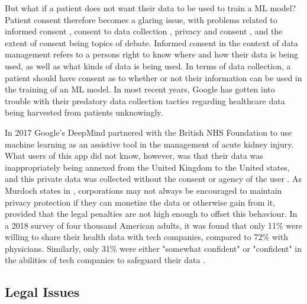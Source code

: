 \documentclass[12pt]{article}
\begin{document}
But what if a patient does not want their data to be used to train a ML model? Patient consent therefore becomes a glaring issue, with problems related to informed consent \citep{Gerke_2020,Guan_2019}, consent to data collection \citep{Gerke_2020,Ali_2023,Murdoch_2021}, privacy and consent \citep{Murdoch_2021}, and the extent of consent \citep{Racine_2019,Price_2019} being topics of debate. Informed consent in the context of data management refers to a persons right to know where and how their data is being used, as well as what kinds of data is being used. In terms of data collection, a patient should have consent as to whether or not their information can be used in the training of an ML model. In most recent years, Google has gotten into trouble with their predatory data collection tactics regarding healthcare data being harvested from patients unknowingly.\

In 2017 Google's DeepMind partnered with the British NHS Foundation to use machine learning as an assistive tool in the management of acute kidney injury. What users of this app did not know, however, was that their data was inappropriately being annexed from the United Kingdom to the United states, and this private data was collected without the consent or agency of the user \citep{Gerke_2020,Murdoch_2021}. As Murdoch states in \citep{Murdoch_2021}, corporations may not always be encouraged to maintain privacy protection if they can monetize the data or otherwise gain from it, provided that the legal penalties are not high enough to offset this behaviour. In a 2018 survey of four thousand American adults, it was found that only 11\% were willing to share their health data with tech companies, compared to 72\% with physicians. Similarly, only 31\% were either "somewhat confident" or "confident" in the abilities of tech companies to safeguard their data \citep{Murdoch_2021}.\






\subsection{Legal Issues}

\newpage


\end{document}
